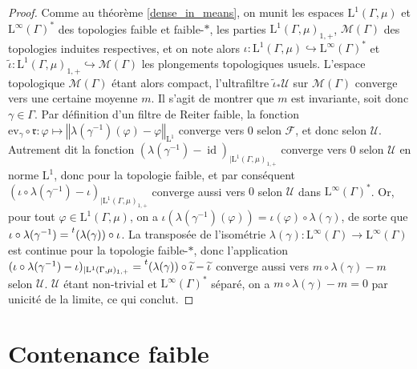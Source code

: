 \documentclass[a4paper,12pt]{article}
\newcommand{\ev}{\mathrm{ev}}
\newcommand{\norm}[1]{\left\Vert #1\right\Vert}
\newcommand{\transpose}[1]{\prescript{t}{}{#1}{}{}}
\newcommand{\inv}{^{-1}}
\newcommand{\comp}{\circ}
\DeclareMathOperator{\id}{id}
\begin{document}
\begin{proof}
    Comme au théorème \ref{dense_in_means}, on munit les espaces $\mathrm{L}^1(\Gamma, \mu)$ et $\mathrm{L}^\infty(\Gamma)^*$ des topologies faible et faible-$*$,
    les parties $\mathrm{L}^1(\Gamma, \mu)_{1, +}$, $\mathcal{M}(\Gamma)$ des topologies induites respectives, et on note alors
    $\iota:\mathrm{L}^1(\Gamma, \mu)\hookrightarrow\mathrm{L}^\infty(\Gamma)^*$ et $\widetilde{\iota}:\mathrm{L}^1(\Gamma, \mu)_{1, +}\hookrightarrow \mathcal{M}(\Gamma)$
    les plongements topologiques usuels. L'espace topologique $\mathcal{M}(\Gamma)$ étant alors compact,
    l'ultrafiltre $\widetilde{\iota}_*\mathscr{U}$ sur $\mathcal{M}(\Gamma)$ converge vers une certaine moyenne $m$. Il s'agit de montrer que $m$ est invariante,
    soit donc $\gamma\in\Gamma$. Par définition d'un filtre de Reiter faible, la fonction $\ev_\gamma\comp\mathfrak{r}:\varphi\mapsto\norm{\lambda(\gamma\inv)(\varphi)-\varphi}_{\mathrm{L}^1}$
    converge vers $0$ selon $\mathscr{F}$, et donc selon $\mathscr{U}$. Autrement dit la 
    fonction $(\lambda(\gamma\inv)-\id)_{|\mathrm{L}^1(\Gamma, \mu)_{1, +}}$ converge vers $0$ selon $\mathscr{U}$
    en norme $\mathrm{L}^1$, donc pour la topologie faible, et par conséquent $(\iota\comp\lambda(\gamma\inv)-\iota)_{|\mathrm{L}^1(\Gamma, \mu)_{1, +}}$ converge 
    aussi vers $0$ selon $\mathscr{U}$ dans $\mathrm{L}^\infty(\Gamma)^*$. Or, pour tout
    $\varphi\in\mathrm{L}^1(\Gamma, \mu)$, on a $\iota(\lambda(\gamma\inv)(\varphi))=\iota(\varphi)\comp\lambda(\gamma)$, de sorte que 
    $\iota\comp\lambda(\gamma\inv) = \transpose{(\lambda(\gamma))}\comp\iota$.
    La transposée de l'isométrie $\lambda(\gamma):\mathrm{L}^\infty(\Gamma)\to\mathrm{L}^\infty(\Gamma)$ est continue 
    pour la topologie faible-$*$, donc l'application $(\iota\comp\lambda(\gamma\inv)-\iota)_{|\mathrm{L}^1(\Gamma, \mu)_{1, +}} = \transpose{(\lambda(\gamma))}\comp\widetilde{\iota} - \widetilde{\iota}$
    converge aussi vers $m\comp\lambda(\gamma)-m$ selon $\mathscr{U}$.
    $\mathscr{U}$ étant non-trivial et $\mathrm{L}^\infty(\Gamma)^*$ séparé, on a $m\comp\lambda(\gamma)-m = 0$ par unicité de la limite, ce qui conclut.
\end{proof}

\section{Contenance faible}
\end{document}
